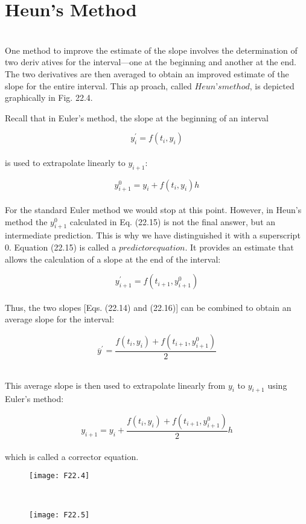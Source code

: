 \section{Heun’s Method}\\
One method to improve the estimate of the slope involves the determination of two derivatives for the interval—one at the beginning and another at the end. The two derivatives are
then averaged to obtain an improved estimate of the slope for the entire interval. This approach, called $Heun’s method$, is depicted graphically in Fig. 22.4.

Recall that in Euler’s method, the slope at the beginning of an interval

\begin{equation}
\tag{22.14}
y^{'}_{i} = f(t_{i},y_{i})
\end{equation}\\
is used to extrapolate linearly to $y_{i+1}$:

\begin{equation}
\tag{22.15}
y^{0}_{i+1} = y_{i} + f( t_{i}, y_{i} )h
\end{equation}\\
For the standard Euler method we would stop at this point. However, in Heun’s method the $y^{0}_{i+1}$ calculated in Eq. (22.15) is not the final answer, but an intermediate prediction. This is
why we have distinguished it with a superscript 0. Equation (22.15) is called a $predictor equation$. It provides an estimate that allows the calculation of a slope at the end of the interval:

\begin{equation}
\tag{22.16}
y^{'}_{i+1} = f( t_{i+1},y^{0}_{i+1})
\end{equation}\\
Thus, the two slopes [Eqs. (22.14) and (22.16)] can be combined to obtain an average slope
for the interval:


$$\overline{y}^{'} = \dfrac{f(t_{i},y_{i} ) + f(t_{i+1}, y^{0}_{i+1}) }{2}$$

\\
This average slope is then used to extrapolate linearly from $y_{i}$ to $y_{i+1}$ using Euler’s
method:

\begin{equation}
\tag{22.17}
y_{i+1} = y_{i} + \dfrac{f(t_{i},y_{i} ) + f(t_{i+1}, y^{0}_{i+1}) }{2}h
\end{equation}\\
which is called a corrector equation.\\
\begin{figure}[hbt!]
	\texttt{[image: F22.4]}
	\label{F22.4}
\end{figure}\\
\pagebreak
\begin{figure}[hbt!]
	\texttt{[image: F22.5]}
	\label{F22.5}
\end{figure}\\

